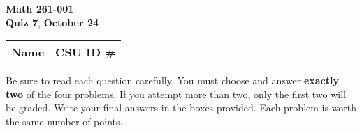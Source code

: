 \documentclass[12pt]{exam}
\newcommand{\class}{Math 261-001} %
\newcommand{\examnum}{Quiz 7} %
\newcommand{\examdate}{October 24} %
\begin{document}
\pagestyle{plain}
\thispagestyle{empty}

\noindent
\textbf{\class}\\
\textbf{\examnum}, \textbf{\examdate} \\



\setlength{\tabcolsep}{3.5cm} %
\renewcommand{\arraystretch}{1.5}
\setlength\extrarowheight{1cm}
\begin{tabular}{ |c|c| } 
 \hline
 Name   & CSU ID \#  \\ 
 \hline
\end{tabular}
\vspace{10pt}
\iffalse

    \foreach \s in {1,...,5}{
          \choice $P_\s$ has no power 
     }%
\fi

Be sure to read each question carefully. You must choose and answer \textbf{exactly two} of the four problems.  
If you attempt more than two, only the first two will be graded.  
Write your final answers in the boxes provided. Each problem is worth the same number of points.  
\end{document}
